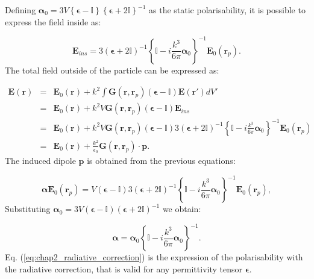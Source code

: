 Defining $\boldsymbol{\alpha}_0 = 3V\left\{\boldsymbol{\epsilon}-\mathbb{I}\right\}\left\{\boldsymbol{\epsilon}+2\mathbb{I}\right\}^{-1}$ as the static polarisability, it is possible to express the field inside as:

\begin{equation}
\mathbf{E}_{ins}=3\left(\boldsymbol{\epsilon}+2\mathbb{I}\right)^{-1}\left\{\mathbb{I}-i\frac{k^3}{6\pi}\boldsymbol{\alpha}_{0}\right\}^{-1}\mathbf{E}_{0}\left(\mathbf{r}_{p}\right).\label{eq:field_inside_particle}
\end{equation}
The total field outside of the particle can be expressed as:

\begin{eqnarray}
\mathbf{E}\left(\mathbf{r}\right) & = & \mathbf{E}_{0}\left(\mathbf{r}\right)+k^{2}\int\mathbf{G}\left(\mathbf{r},\mathbf{r}_{p}\right)\left(\boldsymbol{\epsilon}-\mathbb{I}\right)\mathbf{E}\left(\mathbf{r}'\right)dV' \nonumber \\
 & = & \mathbf{E}_{0}\left(\mathbf{r}\right)+k^{2}V\mathbf{G}\left(\mathbf{r},\mathbf{r}_{p}\right)\left(\boldsymbol{\epsilon}-\mathbb{I}\right)\mathbf{E}_{ins}\nonumber \\
 & = & \mathbf{E}_{0}\left(\mathbf{r}\right)+k^{2}V\mathbf{G}\left(\mathbf{r},\mathbf{r}_{p}\right)\left(\boldsymbol{\epsilon}-\mathbb{I}\right)3\left(\boldsymbol{\epsilon}+2\mathbb{I}\right)^{-1}\left\{\mathbb{I}-i\frac{k^3}{6\pi}\boldsymbol{\alpha}_{0}\right\}^{-1}\mathbf{E}_{0}\left(\mathbf{r}_{p}\right)\nonumber\\
 & = & \mathbf{E}_{0}\left(\mathbf{r}\right) + \frac{k^2}{\epsilon_{0}}\mathbf{G}\left(\mathbf{r},\mathbf{r}_{p}\right)\cdot \mathbf{p} \label{eq:chap2_poleq2}.
\end{eqnarray}
The induced dipole  $\mathbf{p}$ is obtained from the previous equations:

\begin{equation}
\boldsymbol{\alpha}\mathbf{E}_{0}\left(\mathbf{r}_{p}\right) = V\left(\boldsymbol{\epsilon}-\mathbb{I}\right)3\left(\boldsymbol{\epsilon}+2\mathbb{I}\right)^{-1}\left\{\mathbb{I}-i\frac{k^3}{6\pi}\boldsymbol{\alpha}_{0}\right\}^{-1}\mathbf{E}_{0}\left(\mathbf{r}_{p}\right),
\end{equation}
Substituting $\boldsymbol{\alpha}_0= 3V\left(\boldsymbol{\epsilon}-\mathbb{I}\right)\left(\boldsymbol{\epsilon}+2\mathbb{I}\right)^{-1}$ we obtain:

\begin{equation}
\boldsymbol{\alpha}=\boldsymbol{\alpha}_{0}\left\{\mathbb{I}-i\frac{k^3}{6\pi}\boldsymbol{\alpha}_{0}\right\}^{-1}\label{eq:chap2_radiative_correction}.
\end{equation}
Eq. (\ref{eq:chap2_radiative_correction}) is the expression of the polarisability with the radiative correction, that is valid for any permittivity tensor $\boldsymbol{\epsilon}$.

